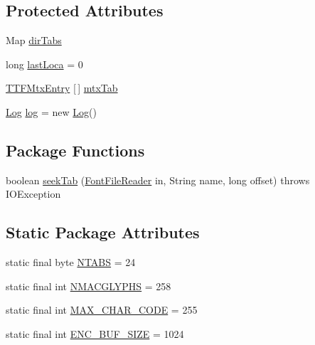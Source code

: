 \subsection*{Protected Attributes}
\begin{DoxyCompactItemize}
\item 
Map \mbox{\hyperlink{classorg_1_1newdawn_1_1slick_1_1tools_1_1hiero_1_1truetype_1_1_t_t_f_file_ace74820d11ce19f9c04797c2715ac728}{dir\+Tabs}}
\item 
long \mbox{\hyperlink{classorg_1_1newdawn_1_1slick_1_1tools_1_1hiero_1_1truetype_1_1_t_t_f_file_a7695b01625c4f0df50b519a43e4ca499}{last\+Loca}} = 0
\item 
\mbox{\hyperlink{classorg_1_1newdawn_1_1slick_1_1tools_1_1hiero_1_1truetype_1_1_t_t_f_mtx_entry}{T\+T\+F\+Mtx\+Entry}} \mbox{[}$\,$\mbox{]} \mbox{\hyperlink{classorg_1_1newdawn_1_1slick_1_1tools_1_1hiero_1_1truetype_1_1_t_t_f_file_ad78a13682e242fc4a0b5d34a8e5807fa}{mtx\+Tab}}
\item 
\mbox{\hyperlink{classorg_1_1newdawn_1_1slick_1_1tools_1_1hiero_1_1truetype_1_1_log}{Log}} \mbox{\hyperlink{classorg_1_1newdawn_1_1slick_1_1tools_1_1hiero_1_1truetype_1_1_t_t_f_file_ae6acbd4aea68fd8cf15305aa535993f4}{log}} = new \mbox{\hyperlink{classorg_1_1newdawn_1_1slick_1_1tools_1_1hiero_1_1truetype_1_1_log}{Log}}()
\end{DoxyCompactItemize}
\subsection*{Package Functions}
\begin{DoxyCompactItemize}
\item 
boolean \mbox{\hyperlink{classorg_1_1newdawn_1_1slick_1_1tools_1_1hiero_1_1truetype_1_1_t_t_f_file_abccbd8b00bcebc8015fa41fef0239cf4}{seek\+Tab}} (\mbox{\hyperlink{classorg_1_1newdawn_1_1slick_1_1tools_1_1hiero_1_1truetype_1_1_font_file_reader}{Font\+File\+Reader}} in, String name, long offset)  throws I\+O\+Exception 
\end{DoxyCompactItemize}
\subsection*{Static Package Attributes}
\begin{DoxyCompactItemize}
\item 
static final byte \mbox{\hyperlink{classorg_1_1newdawn_1_1slick_1_1tools_1_1hiero_1_1truetype_1_1_t_t_f_file_a2767cf0326a11377f68a6a6f214b538d}{N\+T\+A\+BS}} = 24
\item 
static final int \mbox{\hyperlink{classorg_1_1newdawn_1_1slick_1_1tools_1_1hiero_1_1truetype_1_1_t_t_f_file_a8e3c108b82b051fbba1dc445df3df50d}{N\+M\+A\+C\+G\+L\+Y\+P\+HS}} = 258
\item 
static final int \mbox{\hyperlink{classorg_1_1newdawn_1_1slick_1_1tools_1_1hiero_1_1truetype_1_1_t_t_f_file_ae9dfbf026637827b56068b8a32d71dc3}{M\+A\+X\+\_\+\+C\+H\+A\+R\+\_\+\+C\+O\+DE}} = 255
\item 
static final int \mbox{\hyperlink{classorg_1_1newdawn_1_1slick_1_1tools_1_1hiero_1_1truetype_1_1_t_t_f_file_a162e5891ec5260138e46639dd9a0f952}{E\+N\+C\+\_\+\+B\+U\+F\+\_\+\+S\+I\+ZE}} = 1024
\end{DoxyCompactItemize}
